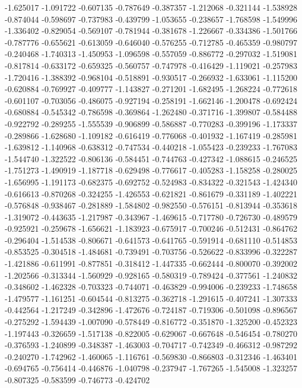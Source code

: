 -1.625017
-1.091722
-0.607135
-0.787649
-0.387357
-1.212068
-0.321144
-1.538928
-0.874044
-0.598697
-0.737983
-0.439799
-1.053655
-0.238657
-1.768598
-1.549996
-1.336402
-0.829054
-0.569107
-0.781944
-0.381678
-1.226667
-0.334386
-1.501766
-0.787776
-0.655621
-0.613059
-0.646040
-0.576255
-0.712785
-0.465359
-0.980797
-0.240468
-1.740313
-1.450953
-1.096598
-0.557059
-0.886772
-0.297032
-1.519081
-0.817814
-0.633172
-0.659325
-0.560757
-0.747978
-0.416429
-1.119021
-0.257983
-1.720416
-1.388392
-0.968104
-0.518891
-0.930517
-0.266932
-1.633061
-1.115200
-0.620884
-0.769927
-0.409777
-1.143827
-0.271201
-1.682495
-1.268224
-0.772618
-0.601107
-0.703056
-0.486075
-0.927194
-0.258191
-1.662146
-1.200478
-0.692424
-0.680884
-0.545342
-0.786598
-0.369864
-1.262480
-0.371716
-1.399807
-0.584488
-0.922792
-0.289255
-1.555539
-0.906899
-0.586887
-0.770283
-0.399196
-1.173337
-0.289866
-1.628680
-1.109182
-0.616419
-0.776068
-0.401932
-1.167419
-0.285981
-1.639812
-1.140968
-0.638312
-0.747534
-0.440218
-1.055423
-0.239233
-1.767083
-1.544740
-1.322522
-0.806136
-0.584451
-0.744763
-0.427342
-1.088615
-0.246525
-1.751273
-1.490919
-1.187718
-0.629498
-0.776617
-0.405283
-1.158258
-0.280025
-1.656995
-1.191173
-0.682375
-0.692752
-0.524983
-0.834322
-0.321543
-1.424340
-0.616613
-0.870268
-0.324255
-1.426553
-0.621821
-0.861679
-0.331189
-1.402221
-0.576848
-0.938467
-0.281889
-1.584802
-0.982550
-0.576151
-0.813944
-0.353618
-1.319072
-0.443635
-1.217987
-0.343967
-1.469615
-0.717780
-0.726730
-0.489579
-0.925921
-0.259678
-1.656621
-1.183923
-0.675917
-0.700246
-0.512431
-0.864762
-0.296404
-1.514538
-0.806671
-0.641573
-0.641765
-0.591914
-0.681110
-0.514853
-0.853525
-0.304518
-1.484681
-0.739491
-0.703756
-0.526622
-0.833996
-0.322287
-1.421886
-0.611991
-0.877851
-0.318412
-1.447335
-0.662444
-0.800070
-0.392002
-1.202566
-0.313344
-1.560929
-0.928165
-0.580319
-0.789424
-0.377561
-1.240832
-0.348602
-1.462328
-0.703323
-0.744071
-0.463829
-0.994006
-0.239233
-1.748658
-1.479577
-1.161251
-0.604544
-0.813275
-0.362718
-1.291615
-0.407241
-1.307333
-0.442564
-1.217249
-0.342896
-1.472676
-0.724187
-0.719306
-0.501098
-0.896567
-0.275292
-1.594439
-1.007090
-0.578449
-0.816772
-0.351870
-1.325200
-0.452323
-1.197443
-0.326659
-1.517138
-0.822005
-0.629067
-0.667648
-0.546454
-0.780270
-0.376593
-1.240899
-0.348387
-1.463003
-0.704717
-0.742349
-0.466312
-0.987292
-0.240270
-1.742962
-1.460065
-1.116761
-0.569830
-0.866803
-0.312346
-1.463401
-0.694765
-0.756414
-0.446876
-1.040798
-0.237947
-1.767265
-1.545008
-1.323257
-0.807325
-0.583599
-0.746773
-0.424702
